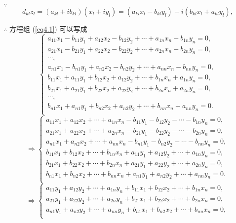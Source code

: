 \documentclass[UTF8]{ctexart}
\begin{document}
\begin{solution}
    $\because$
    \[d_{kl}z_l=(a_{kl}+ib_{kl})(x_l+iy_l)=(a_{kl}x_l-b_{kl}y_l)+i(b_{kl}x_l+a_{kl}y_l),\]

    $\therefore$ 方程组 (\ref{eq4.1}) 可以写成
    \[\begin{cases}
        a_{11}x_1-b_{11}y_1+a_{12}x_2-b_{12}y_2+\cdots+a_{1n}x_n-b_{1n}y_n=0, \\
        a_{21}x_1-b_{21}y_1+a_{22}x_2-b_{22}y_2+\cdots+a_{2n}x_n-b_{2n}y_n=0, \\
        \cdots, \\
        a_{n1}x_1-b_{n1}y_1+a_{n2}x_2-b_{n2}y_2+\cdots+a_{nn}x_n-b_{nn}y_n=0, \\
        b_{11}x_1+a_{11}y_1+b_{12}x_2+a_{12}y_2+\cdots+b_{1n}x_n+a_{1n}y_n=0, \\
        b_{21}x_1+a_{21}y_1+b_{22}x_2+a_{22}y_2+\cdots+b_{2n}x_n+a_{2n}y_n=0, \\
        \cdots, \\
        b_{n1}x_1+a_{n1}y_1+b_{n2}x_2+a_{n2}y_2+\cdots+b_{nn}x_n+a_{nn}y_n=0. \\
    \end{cases}\]
    \[\Rightarrow\begin{cases}
        a_{11}x_1+a_{12}x_2+\cdots+a_{1n}x_n-b_{11}y_1-b_{12}y_2-\cdots-b_{1n}y_n=0, \\
        a_{21}x_1+a_{22}x_2+\cdots+a_{2n}x_n-b_{21}y_1-b_{22}y_2-\cdots-b_{2n}y_n=0, \\
        a_{n1}x_1+a_{n2}x_2+\cdots+a_{nn}x_n-b_{n1}y_1-b_{n2}y_2-\cdots-b_{nn}y_n=0, \\
        b_{11}x_1+b_{12}x_2+\cdots+b_{1n}x_n+a_{11}y_1+a_{12}y_2+\cdots+a_{1n}y_n=0, \\
        b_{21}x_1+b_{22}x_2+\cdots+b_{2n}x_n+a_{21}y_1+a_{22}y_2+\cdots+a_{2n}y_n=0, \\
        b_{n1}x_1+b_{n2}x_2+\cdots+b_{nn}x_n+a_{n1}y_1+a_{n2}y_2+\cdots+a_{nn}y_n=0. \\
    \end{cases}\]
    \begin{equation}\label{eq4.2}
        \Rightarrow\begin{cases}
            a_{11}y_1+a_{12}y_2+\cdots+a_{1n}y_n+b_{11}x_1+b_{12}x_2+\cdots+b_{1n}x_n=0,  \\
            a_{21}y_1+a_{22}y_2+\cdots+a_{2n}y_n+b_{21}x_1+b_{22}x_2+\cdots+b_{2n}x_n=0,  \\
            a_{n1}y_1+a_{n2}y_2+\cdots+a_{nn}y_n+b_{n1}x_1+b_{n2}x_2+\cdots+b_{nn}x_n=0,  \\

\end{cases}
\end{equation}
\end{solution}
\end{document}
